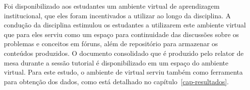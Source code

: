 Foi disponibilizado aos estudantes um ambiente virtual de aprendizagem
institucional, que eles foram incentivados a utilizar ao longo
da disciplina.
A condução da disciplina estimulou os estudantes a
utilizarem este ambiente virtual que para eles serviu como um
espaço para continuidade das discussões sobre os problemas
e conceitos em fóruns, além de repositório para armazenar
os conteúdos produzidos.
O documento consolidado que é produzido pelo relator de mesa
durante a sessão tutorial é disponibilizado em um espaço
do ambiente virtual.
Para este estudo, o ambiente de virtual serviu
também como ferramenta para obtenção dos dados,
como está detalhado no
capítulo~\ref{cap-resultados}.
